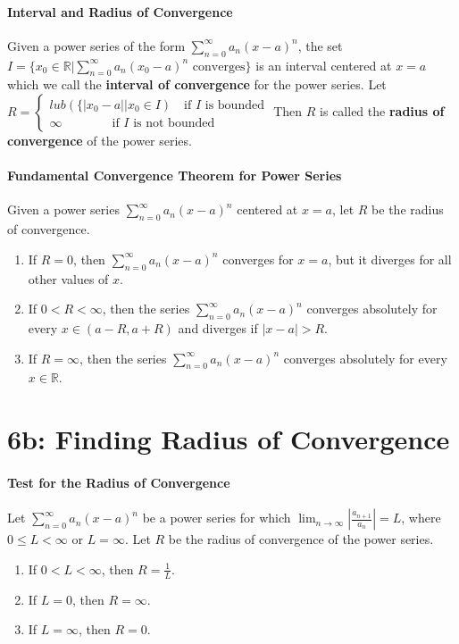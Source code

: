 \documentclass[10pt,letter]{article}
\begin{document}
\paragraph{Interval and Radius of Convergence}
Given a power series of the form $\sum_{n=0}^\infty a_n(x-a)^n$, the set $I=\{x_0\in\mathbb{R}|\sum_{n=0}^\infty a_n(x_0-a)^n \text{ converges}\}$ is an interval centered at $x=a$ which we call the \textbf{interval of convergence} for the power series. Let $R=\begin{cases}lub(\{|x_0-a||x_0\in I)\quad\text{if }I\text{ is bounded}\\\infty \quad\quad\quad\quad\text{if }I\text{ is not bounded}\end{cases}$ Then $R$ is called the \textbf{radius of convergence} of the power series. 
\paragraph{Fundamental Convergence Theorem for Power Series}
Given a power series $\sum_{n=0}^\infty a_n(x-a)^n$ centered at $x=a$, let $R$ be the radius of convergence. 
\begin{enumerate}
    \item If $R=0$, then $\sum_{n=0}^\infty a_n(x-a)^n$ converges for $x=a$, but it diverges for all other values of $x$. 
    \item If $0<R<\infty$, then the series $\sum_{n=0}^\infty a_n(x-a)^n$ converges absolutely for every $x\in(a-R,a+R)$ and diverges if $|x-a|>R$.
    \item If $R=\infty$, then the series $\sum_{n=0}^\infty a_n(x-a)^n$ converges absolutely for every $x\in\mathbb{R}$. 
\end{enumerate}


\section*{6b: Finding Radius of Convergence}
\paragraph{Test for the Radius of Convergence}
Let $\sum_{n=0}^\infty a_n(x-a)^n$ be a power series for which $\lim_{n\rightarrow\infty}\left|\frac{a_{n+1}}{a_n}\right|=L$, where $0\leq L<\infty$ or $L=\infty$. Let $R$ be the radius of convergence of the power series. \begin{enumerate}
    \item If $0<L<\infty$, then $R=\frac{1}{L}$. 
    \item If $L=0$, then $R=\infty$. 
    \item If $L=\infty$, then $R=0$. 
\end{enumerate}
\end{document}
